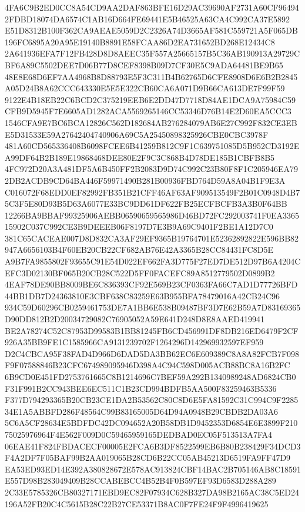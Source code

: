 \documentclass[UTF8,fontset=fandol,zihao=-4,a4paper]{ctexart}
\begin{document}
{{4FA6C9B2ED0CC8A54CD9AA2DAF863BFE16D29AC39690AF2731A60CF964942FDBD18074DA6574C1AB16D664FE69441E5B46525A63CA4C992CA37E5892
E51D8312B100F362CA9AEAE5059D2C2326A74D3665AF581C559721A5F065DB196FC6895A20A95E19140B8891E58FCAA86D2EA731652BD268E12434C8
2A641936EFA7F12FB428D8D8AEEC35F557A25665157B5C36AB190913A29729CBF6A89C5502DEE7D06B77D8CEF8398B09D7CF30E5C9ADA64481BE9B65
48E8E68D6EF7AA4968B8D88793E5F3C311B4B62765D6CFE8908D6E6B2B2845A05D24B8A62CCC643330E5E5E322CB60CA6A071D9B66CA613DE7F99F59
9122E4B18EB22C6BCD2C375219EEB6E2DD47D7718D84AE1DCA9A75984C59CFB9D5945F7E6605AD1282ACA5569265146CC53346D76B14E2D60EA5CCC3
1546CFA9E7BC6BCA12826C562D182684AB276284079AB6E27C992F832CE3EBE5D31533E59A27642404740906A69C5A25450898325926CBE0CBC3978F
481A60CD565336408B6098FCEE6B41259B812C9F1C639751085D5B952CD3192EA99DF64B2B189E19868468DEE80E2F9C3C868B4D78DE185B1CBFB8B5
4FC972D20A3A481DF5A6B450FF2B2083D9D74C992C23B80F8F1C205946EA792DB2ACDB9CD64BA446F59971490B281B00936FBD764D59A8A04B1F9E3A
C016072F68EDD0EF82992FB351B21CFF46AF63AF909513549F2B01C0948D4B75C3F5E80D93B5D63A6077E33BC9DD61DF622FB25ECFBCFB3A3B0F64BB
12266BA9BBAF99325906AEBB06590659565986D46BD72FC292003741F0EA336515902C037C992CE3B9DEEEB06F8197D7E3B9A69C9401F2BE1A12D7C0
381C65CACEAE007D8D832CA3AF29EF9365B19764701E52362892822E596BB82947A6656103B4F60EB20CB22CF682AB76E42A3365B28CC84431FC8D5E
A9B7FA9855802F93655C91E54D022EF662FA3D775F27ED7DE512D97B6A4204CEFC3D02130BF065B20CB28C522D5FF0FACEFC89A8512779502D0899B2
4EAF78DE90BB8009BE6C836393CF92E569B23CF0363FA66C7AD1D77726BFD44BB1DB7D24363810E3CBF638C83259E63B955BFA78479016A42CB24C96
934C59D60296CB0259461753DE7A1BB6E538B09487BF3D7E62B59A7D83169365D90DD812B2D20034729082C76905052A59E641D248D8E8AAED419941
BE2A78274C52C87953D99583B1BB81245FB6CD456991DF8DB216ED6479F2CF926A35BB9FE1C1585966CA9131239702F1264296D142969932597EF959
D2C4CBCA95F38FAD4D966D6DAD5DA3BB62EC6E609389C8A8A82FCB7F098F9F07588846B23CFC674989095946D398A4C94C598D005ACB88BC8A16B2FC
6B9CD0E451FD2753761665C8B1214696C7BEF59A292B1340989248AD6824CB0F31F991B2CC943BEE6EC511C1B23CD994BDFB5AA500F83259463B5336
F377D794293365B20CB23CE1DA2B53562C80C8D6E5FA81592C31C994C9F228534E1A5ABBFD286F48564C99B83165005D64D94A0948B29CBDB2DA03A6
5C6A5CF28634E5BDFDC42DC094652A20B58DB1D9452353D6854E6E3899F21075025976964F4E562F009D0C59465959165DEDBAD0EC05F513513A7FA4
06EAE41F824FBDACECF00005E2FCA6B3DF8522599EB6B80B238429F34DCD3F4A2DF7F05BAF99B2AA019065B28CD6B22CC05AB45213D6519FA9FF47D9
EA53ED93ED14E392A380828672E578AC913824CBF14BAC2B705146AB8C18591E557D98B283049409B28CCABEBCC4B52B4F0B597EF93D6583D288A289
2C33E5785326CB80327171EBD9EC82F07934C628B327DA98B2165AC38C5ED24196A52FB20C4C5615B28C22B27CE53371B8AC0F7FE24F9F4996419625
}}
\end{document}
